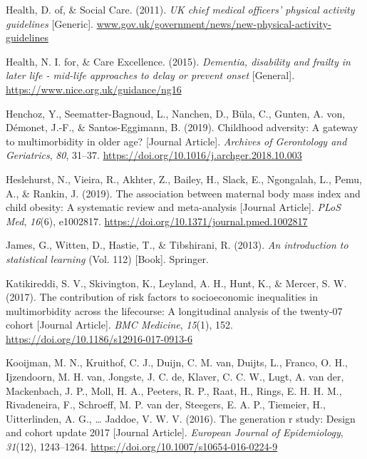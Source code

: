 \documentclass[
  letterpaper,
  DIV=11,
  numbers=noendperiod]{scrreport}
\newlength{\cslhangindent}
\newenvironment{CSLReferences}[2] %
 {\begin{list}{}{%
  \setlength{\itemindent}{0pt}
  \setlength{\leftmargin}{0pt}
  \setlength{\parsep}{0pt}
  \ifodd #1
   \setlength{\leftmargin}{\cslhangindent}
   \setlength{\itemindent}{-1\cslhangindent}
  \fi
  \setlength{\itemsep}{#2\baselineskip}}}
 {\end{list}}
\begin{document}
\begin{CSLReferences}{1}{0}
Health, D. of, \& Social Care. (2011). \emph{UK chief medical officers'
physical activity guidelines} {[}Generic{]}.
\href{https://www.gov.uk/government/news/new-physical-activity-guidelines}{www.gov.uk/government/news/new-physical-activity-guidelines}

Health, N. I. for, \& Care Excellence. (2015). \emph{Dementia,
disability and frailty in later life - mid-life approaches to delay or
prevent onset} {[}General{]}.
\url{https://www.nice.org.uk/guidance/ng16}

Henchoz, Y., Seematter-Bagnoud, L., Nanchen, D., Büla, C., Gunten, A.
von, Démonet, J.-F., \& Santos-Eggimann, B. (2019). Childhood adversity:
A gateway to multimorbidity in older age? {[}Journal Article{]}.
\emph{Archives of Gerontology and Geriatrics}, \emph{80}, 31--37.
\url{https://doi.org/10.1016/j.archger.2018.10.003}

Heslehurst, N., Vieira, R., Akhter, Z., Bailey, H., Slack, E.,
Ngongalah, L., Pemu, A., \& Rankin, J. (2019). The association between
maternal body mass index and child obesity: A systematic review and
meta-analysis {[}Journal Article{]}. \emph{PLoS Med}, \emph{16}(6),
e1002817. \url{https://doi.org/10.1371/journal.pmed.1002817}

James, G., Witten, D., Hastie, T., \& Tibshirani, R. (2013). \emph{An
introduction to statistical learning} (Vol. 112) {[}Book{]}. Springer.

Katikireddi, S. V., Skivington, K., Leyland, A. H., Hunt, K., \& Mercer,
S. W. (2017). The contribution of risk factors to socioeconomic
inequalities in multimorbidity across the lifecourse: A longitudinal
analysis of the twenty-07 cohort {[}Journal Article{]}. \emph{BMC
Medicine}, \emph{15}(1), 152.
\url{https://doi.org/10.1186/s12916-017-0913-6}

Kooijman, M. N., Kruithof, C. J., Duijn, C. M. van, Duijts, L., Franco,
O. H., Ijzendoorn, M. H. van, Jongste, J. C. de, Klaver, C. C. W., Lugt,
A. van der, Mackenbach, J. P., Moll, H. A., Peeters, R. P., Raat, H.,
Rings, E. H. H. M., Rivadeneira, F., Schroeff, M. P. van der, Steegers,
E. A. P., Tiemeier, H., Uitterlinden, A. G., \ldots{} Jaddoe, V. W. V.
(2016). The generation r study: Design and cohort update 2017 {[}Journal
Article{]}. \emph{European Journal of Epidemiology}, \emph{31}(12),
1243--1264. \url{https://doi.org/10.1007/s10654-016-0224-9}


\end{CSLReferences}
\end{document}
